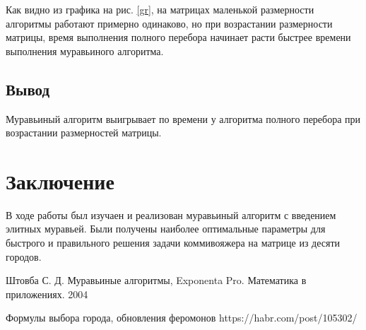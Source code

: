 \documentclass[a4paper, 14pt]{article}
\begin{document}
	Как видно из графика на рис. \ref{gr}, на матрицах маленькой размерности алгоритмы работают примерно одинаково, но при возрастании размерности матрицы, время выполнения полного перебора начинает расти быстрее времени выполнения муравьиного алгоритма. 
	
	\subsection{Вывод}
	
	Муравьиный алгоритм выигрывает по времени у алгоритма полного перебора при возрастании размерностей матрицы.

	\newpage
	\section*{Заключение}
	
	
	В ходе работы был изучаен и реализован муравьиный алгоритм с введением элитных муравьей. Были получены наиболее оптимальные параметры для быстрого и правильного решения задачи коммивояжера на матрице из десяти городов.
	
	
\newpage
\begin{thebibliography}{}

 Штовба С. Д. Муравьиные алгоритмы, Exponenta Pro. Математика в приложениях. 2004
    
 Формулы выбора города, обновления феромонов https://habr.com/post/105302/

\end{thebibliography}
\end{document}
